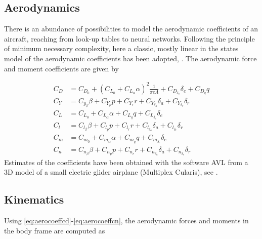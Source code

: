 \documentclass{ifacconf}
\begin{document}
\subsection{Aerodynamics}
There is an abundance of possibilities to model the aerodynamic coefficients of an aircraft, reaching from look-up tables to neural networks. Following the principle of minimum necessary complexity, here a classic, mostly linear in the states model of the aerodynamic coefficients has been adopted, \cite{Beard2012}. 
The aerodynamic force and moment coefficients are given by 

\begin{align}
C_D &=  
C_{D_{0}}
+ (C_{L_0} + C_{L_{\alpha}} \alpha)^2 \frac{1}{\pi e \Lambda} 
+ C_{D_{\delta_e}} \delta_e
+ C_{D_{q}} q
\label{eq:aerocoeffcd} \\
C_Y &= 
C_{y_{\beta}} \beta
+ C_{Y_{p}} p
+ C_{Y_{r}} r
+ C_{Y_{\delta_a}} \delta_a
+ C_{Y_{\delta_r}} \delta_r
\\
C_L &=  
C_{L_{0}} 
+ C_{L_{\alpha}} \alpha
+ C_{L_{q}} q
+ C_{L_{\delta_e}} \delta_e
\\
C_l &=  
C_{l_{\beta}} \beta
+ C_{l_{p}} p
+ C_{l_{r}} r
+ C_{l_{\delta_a}} \delta_a
+ C_{l_{\delta_r}} \delta_r
\\
C_m &=  
C_{m_{0}}
+ C_{m_{\alpha}} \alpha
+ C_{m_{q}} q
+ C_{m_{\delta_e}} \delta_e
\\
C_n &=  
C_{n_{\beta}} \beta
+ C_{n_{p}} p
+ C_{n_{r}} r
+ C_{n_{\delta_a}} \delta_a
+ C_{n_{\delta_r}} \delta_r
\label{eq:aerocoeffcn}
\end{align}
Estimates of the coefficients have been obtained with the software AVL from a 3D model of a small electric glider airplane (Multiplex Cularis), see \cite{StollePhD2016}.\\

\subsection{Kinematics}
Using \ref{eq:aerocoeffcd}-\ref{eq:aerocoeffcn}, the aerodynamic forces and moments in the body frame are computed as
\end{document}
